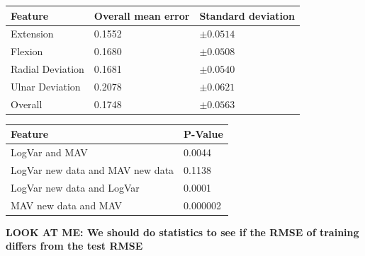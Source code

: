	
	\begin{center}
		\begin{tabular}{l l l}
			\toprule
			\textbf{Feature} & \textbf{Overall mean error} & \textbf{Standard deviation}\\
			\midrule
			Extension & 0.1552 & $\pm 0.0514$ \\
			Flexion & 0.1680 & $\pm 0.0508$ \\
			Radial Deviation & 0.1681 & $\pm 0.0540$ \\
			Ulnar Deviation & 0.2078 & $\pm 0.0621$ \\
			Overall & 0.1748 & $\pm 0.0563$ \\
			\bottomrule
		\end{tabular}
	\end{center}
	
		\begin{center}
			\begin{tabular}{l l}
				\toprule
				\textbf{Feature} & \textbf{P-Value}\\
				\midrule
				LogVar and MAV & 0.0044 \\
				LogVar new data and MAV new data & 0.1138 \\
				LogVar new data and LogVar & 0.0001 \\
				MAV new data and MAV & 0.000002 \\
				\bottomrule
			\end{tabular}
		\end{center}
		


\textbf{LOOK AT ME: We should do statistics to see if the RMSE of training differs from the test RMSE}
